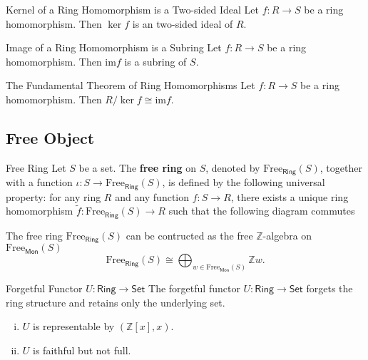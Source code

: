 \begin{proposition}{Kernel of a Ring Homomorphism is a Two-sided Ideal}{}
    Let $f:R\to S$ be a ring homomorphism. Then $\ker f$ is an two-sided ideal of $R$.
\end{proposition}

\begin{proposition}{Image of a Ring Homomorphism is a Subring}{}
    Let $f:R\to S$ be a ring homomorphism. Then $\mathrm{im}f$ is a subring of $S$.
\end{proposition}

\begin{theorem}{The Fundamental Theorem of Ring Homomorphisms}{}
    Let $f:R\to S$ be a ring homomorphism. Then $R/\ker f\cong \mathrm{im}f$.
\end{theorem}


\subsection{Free Object}
\begin{definition}{Free Ring}{}
    Let $S$ be a set. The \textbf{free ring} on $S$, denoted by $\mathrm{Free}_{\mathsf{Ring}}(S)$, together with a function $\iota:S\to \mathrm{Free}_{\mathsf{Ring}}(S)$, is defined by the following universal property: for any ring $R$ and any function $f:S\to R$, there exists a unique ring homomorphism $\widetilde{f}:\mathrm{Free}_{\mathsf{Ring}}(S)\to R$ such that the following diagram commutes
    \begin{center}
    \end{center}
    The free ring $\mathrm{Free}_{\mathsf{Ring}}(S)$ can be contructed as the free $\mathbb{Z}$-algebra on $\mathrm{Free}_{\mathsf{Mon}}(S)$
    \[
        \mathrm{Free}_{\mathsf{Ring}}(S)\cong\bigoplus_{w\in\mathrm{Free}_{\mathsf{Mon}}(S)}\mathbb{Z}w.  
    \]
\end{definition}


\begin{example}{Forgetful Functor $U:\mathsf{Ring}\to\mathsf{Set}$}{}
    The forgetful functor $U:\mathsf{Ring}\to\mathsf{Set}$ forgets the ring structure and retains only the underlying set.
    \begin{enumerate}[(i)]
        \item $U$ is representable by $\left(\mathbb{Z}[x],x\right)$.
        \item $U$ is faithful but not full.
    \end{enumerate}
\end{example}


